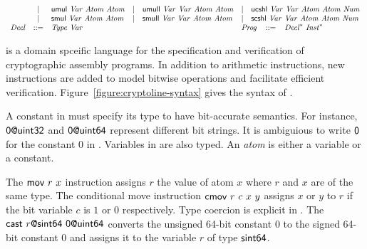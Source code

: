 \begin{figure*}
\begin{math}
\begin{array}{rclclcl}
      & | & \clUMul\ \mathit{Var}\ \mathit{Atom}\ \mathit{Atom}
      & | & \clUMull\ \mathit{Var}\ \mathit{Var}\
            \mathit{Atom}\ \mathit{Atom}
      & | & \clUCShl\ \mathit{Var}\ \mathit{Var}\
            \mathit{Atom}\ \mathit{Atom}\ \mathit{Num}\\
      & | & \clSMul\ \mathit{Var}\ \mathit{Atom}\ \mathit{Atom}
      & | & \clSMull\ \mathit{Var}\ \mathit{Var}\
            \mathit{Atom}\ \mathit{Atom}
      & | & \clSCShl\ \mathit{Var}\ \mathit{Var}\
            \mathit{Atom}\ \mathit{Atom}\ \mathit{Num}\\
      \mathit{Decl} & ::= &
        \multicolumn{2}{l}{\mathit{Type}\ \mathit{Var}}
      &&
      \multicolumn{2}{l}{
         \mathit{Prog} \hspace{2ex} ::=\hspace{2ex}
         \mathit{Decl}^*\ \mathit{Inst}^*
      }
    \end{array}
  \end{math}
  \caption{\cryptoline Syntax}
  \label{figure:cryptoline-syntax}
\end{figure*}

\cryptoline is a domain spceific language for the specification and
verification of cryptographic assembly programs. In addition to
arithmetic instructions, new instructions are added to model bitwise
operations and facilitate efficient verification.
Figure~\ref{figure:cryptoline-syntax} gives the syntax of \cryptoline.

A constant in \cryptoline must specify its type to have bit-accurate
semantics. For instance, $\mytextsf{0@uint32}$ and $\mytextsf{0@uint64}$
represent different bit strings. It is ambiguious to write
$\mytextsf{0}$ for the constant $0$ in \cryptoline. Variables in
\cryptoline are also typed. An \emph{atom} is either a variable or a
constant.

The $\clMov\ r\ x$ instruction assigns $r$ the value of atom $x$ where
$r$ and $x$ are of the same type. The conditional move instruction
$\clCmov\ r\ c\ x\ y$ assigns $x$ or $y$ to $r$ if the bit variable
$c$ is $1$ or $0$ respectively. Type coercion is explicit in
\cryptoline. The $\clVPCast\ r\mytextsf{@sint64}\ \mytextsf{0@uint64}$
converts the unsigned 64-bit constant $0$ to the signed 64-bit
constant $0$ and assigns it to the variable $r$ of type $\mytextsf{sint64}$.

